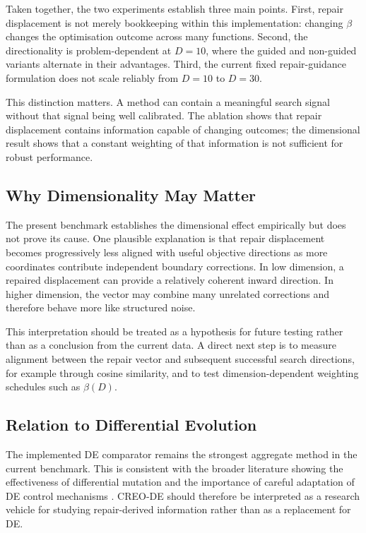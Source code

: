 \documentclass[journal]{IEEEtran}
\begin{document}
Taken together, the two experiments establish three main points. First, repair displacement is not merely bookkeeping within this implementation: changing $\beta$ changes the optimisation outcome across many functions. Second, the directionality is problem-dependent at $D=10$, where the guided and non-guided variants alternate in their advantages. Third, the current fixed repair-guidance formulation does not scale reliably from $D=10$ to $D=30$.

This distinction matters. A method can contain a meaningful search signal without that signal being well calibrated. The ablation shows that repair displacement contains information capable of changing outcomes; the dimensional result shows that a constant weighting of that information is not sufficient for robust performance.

\subsection{Why Dimensionality May Matter}

The present benchmark establishes the dimensional effect empirically but does not prove its cause. One plausible explanation is that repair displacement becomes progressively less aligned with useful objective directions as more coordinates contribute independent boundary corrections. In low dimension, a repaired displacement can provide a relatively coherent inward direction. In higher dimension, the vector may combine many unrelated corrections and therefore behave more like structured noise.

This interpretation should be treated as a hypothesis for future testing rather than as a conclusion from the current data. A direct next step is to measure alignment between the repair vector and subsequent successful search directions, for example through cosine similarity, and to test dimension-dependent weighting schedules such as $\beta(D)$.

\subsection{Relation to Differential Evolution}

The implemented DE comparator remains the strongest aggregate method in the current benchmark. This is consistent with the broader literature showing the effectiveness of differential mutation and the importance of careful adaptation of DE control mechanisms \cite{das2011differential,brest2006self,qin2009sade,tanabe2014lshade}. CREO-DE should therefore be interpreted as a research vehicle for studying repair-derived information rather than as a replacement for DE.
\end{document}
